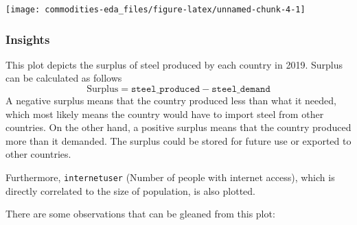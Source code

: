 \documentclass[
]{article}
\begin{document}
\begin{center}\texttt{[image: commodities-eda\_files/figure-latex/unnamed-chunk-4-1]} \end{center}

\hypertarget{insights}{%
\subsubsection{Insights}\label{insights}}

This plot depicts the surplus of steel produced by each country in 2019.
Surplus can be calculated as follows
\[\text{Surplus} = \texttt{steel_produced} - \texttt{steel_demand}\] A
negative surplus means that the country produced less than what it
needed, which most likely means the country would have to import steel
from other countries. On the other hand, a positive surplus means that
the country produced more than it demanded. The surplus could be stored
for future use or exported to other countries.

Furthermore, \texttt{internetuser} (Number of people with internet
access), which is directly correlated to the size of population, is also
plotted.

There are some observations that can be gleaned from this plot:
\end{document}
